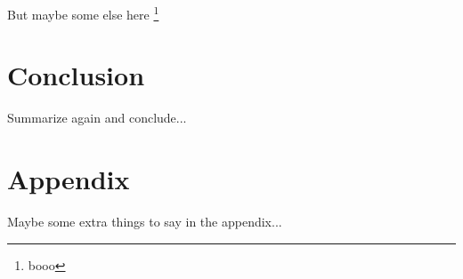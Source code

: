 \documentclass[11pt, letterpaper]{article}
\begin{document}
But maybe some else here \footnote{booo}

\section{Conclusion}\label{sec:conclusion}
Summarize again and conclude...

\pagebreak


\pagebreak
\appendix
\section{Appendix}\label{sec:appendix}
Maybe some extra things to say in the appendix...
\end{document}
